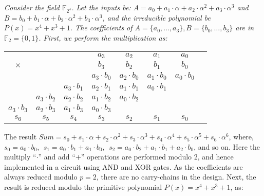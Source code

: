 \begin{Example}
\label{exp1}
{\it 
Consider the field $\mathbb{F}_{2^4}$. Let the inputs be:
$A=a_0+a_1\cdot \alpha+a_2\cdot \alpha^2+a_3\cdot \alpha^3$ and
$B=b_0+b_1\cdot \alpha+b_2\cdot \alpha^2+b_3\cdot \alpha^3$, and 
 the irreducible polynomial be $P(x)=x^4+x^3+1$. 
 The coefficients of $A = \{a_0, \dots, a_3\}, B = \{b_0, \dots, b_3\}$ are in
$\mathbb{F}_2 = \{0, 1\}$. First, we perform the multiplication as:


\vspace{0.05in}

{\small
{\begin{tabular}{c c c c c c c c}
  &   &   & $a_3$ & $a_2$ & $a_1$ & $a_0$  \\ 
 $\times$&   &   & $b_3$ & $b_2$ & $b_1$ & $b_0$  \\ 
 \hline
 &   &   & $a_3\cdot b_0$ & $a_2 \cdot b_0$ & $a_1\cdot b_0$ & $a_0\cdot b_0$ \\
 &  & $a_3\cdot b_1$ & $a_2\cdot b_1$ & $a_1 \cdot b_1$ & $a_0\cdot b_1$ &   \\
 & $a_3\cdot b_2$ & $a_2\cdot b_2$ & $a_1\cdot b_2$ & $a_0\cdot b_2$ &  &   \\
 $a_3\cdot b_3$ & $a_2\cdot b_3$ & $a_1\cdot b_3$ & $a_0\cdot b_3$ &  &  &   \\
 \hline
 $s_6$& $s_5$  & $s_4$  & $s_3$ & $s_2$  & $s_1$   & $s_0$ 
\end{tabular}}
}

\vspace{0.05in}

The result $Sum = s_0+s_1\cdot \alpha + s_2\cdot \alpha^2 + s_3\cdot
\alpha^3 + s_4\cdot \alpha^4 + s_5\cdot \alpha^5 + s_6\cdot \alpha^6$,
where, $s_0  =  a_0\cdot b_0, ~~s_1  =  a_0\cdot b_1 + a_1\cdot b_0,
~~s_2 = a_0\cdot b_2 + a_1\cdot b_1 + a_2\cdot b_0$, and so on. Here
the multiply ``$\cdot$'' and add ``$+$'' operations are performed
modulo 2, and hence implemented in a circuit using AND and XOR
gates. As the coefficients are always reduced modulo $p =
2$, there are no carry-chains
in the design. Next, the result is reduced modulo the primitive
polynomial $P(x) = x^4 + x^3 + 1$, as:

}
\end{Example}
